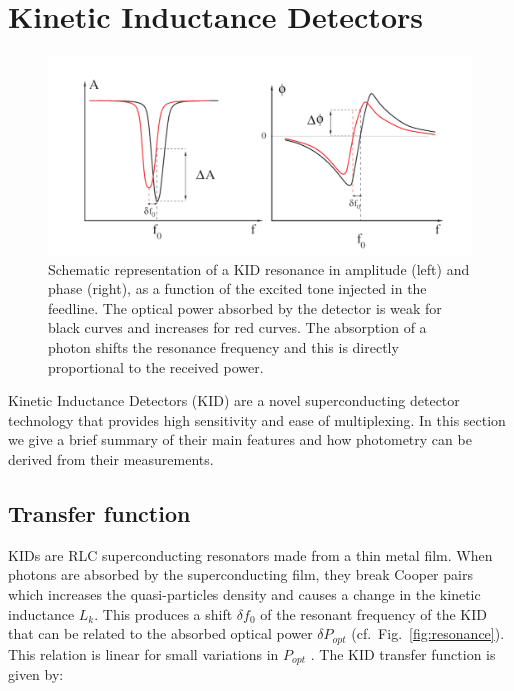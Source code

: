 \section{Kinetic Inductance Detectors}
\label{se:kids}

\begin{figure}
  \includegraphics[clip, angle=0, width=\columnwidth]{Figures/resonance.png}
  \caption{Schematic representation of a KID resonance in amplitude (left) and phase (right), as a function of the excited tone injected in the feedline. The optical power absorbed by the detector is weak for black curves and increases for red curves. The absorption of a photon shifts the resonance frequency and this is directly proportional to the received power.}
  \label{resonance}
\end{figure}

Kinetic Inductance Detectors (KID) are a novel superconducting detector technology
that provides high sensitivity and ease of multiplexing. In this section we give
a brief summary of their main features and how photometry can be derived from
their measurements.

\subsection{Transfer function}

KIDs are RLC superconducting resonators made from a thin metal film. When
photons are absorbed by the superconducting film, they break Cooper pairs which
increases the quasi-particles density and causes a change in the kinetic
inductance $L_{k}$. This produces a shift $\delta f_{0}$ of the resonant
frequency of the KID \citep{2013A&A...551L..12C} that can be related to the
absorbed optical power $\delta P_{opt}$ (cf.~Fig.~\ref{fig:resonance}). This
relation is linear for small variations in $P_{opt}$
\citep{2010ApPhL..96z3511S}. The KID transfer function is given by:

